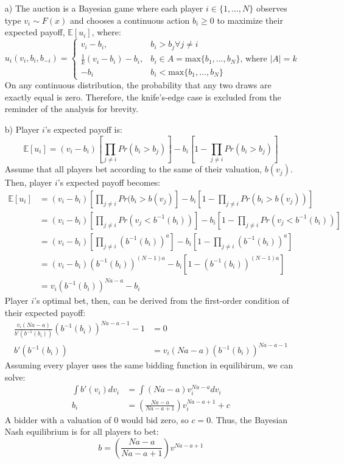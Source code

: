 \documentclass{article}
\newcommand{\E}[1]{\mathbb{E}\left[#1\right]} %
\begin{document}
\begin{itemize}
	\item[a)] The auction is a Bayesian game where each player ${i\in\{1,...,N\}}$ observes type ${v_i\sim F(x)}$ and chooses a continuous action ${b_i\geq 0}$ to maximize their expected payoff, $\E{u_i}$, where:
		\[
			u_i(v_i,b_i,b_{-i}) =	\begin{cases}
										v_i - b_i, 					&b_i>b_j \forall j\neq i									\\
										\frac{1}{k}(v_i-b_i) -b_i, 	&b_i\in A=\text{max}\{b_1,...,b_N\} \text{, where }|A|=k 	\\
										-b_i						&b_i < \text{max}\{b_1,...,b_N\}
									\end{cases}
		\]
		On any continuous distribution, the probability that any two draws are exactly equal is zero. Therefore, the knife's-edge case is excluded from the reminder of the analysis for brevity.

	
	\item[b)] Player $i$'s expected payoff is:
		{\small \[
			\E{u_i} = (v_i - b_i)\left[\prod_{j\neq i}Pr(b_i>b_j)\right] -b_i\left[1-\prod_{j\neq i}Pr(b_i>b_j)\right]
		\] }
		Assume that all players bet according to the same of their valuation, $b(v_j)$. Then, player $i$'s expected payoff becomes:
		\begin{align*}
			\E{u_i} &= (v_i - b_i)\left[\prod_{j\neq i}Pr(b_i>b(v_j)\right]-b_i\left[1-\prod_{j\neq i}Pr(b_i>b(v_j))\right] 							\\
					&= (v_i - b_i)\left[\prod_{j\neq i}Pr\left(v_j < b^{-1}(b_i)\right)\right]-b_i\left[1-\prod_{j\neq i}Pr(v_j < b^{-1}(b_i))\right]	\\
					&= (v_i - b_i)\left[\prod_{j\neq i}\left(b^{-1}(b_i)\right)^a\right]-b_i\left[1-\prod_{j\neq i}\left(b^{-1}(b_i)\right)^a\right] 	\\
					&= (v_i - b_i)\left(b^{-1}(b_i)\right)^{(N-1)a}-b_i\left[1-\left(b^{-1}(b_i)\right)^{(N-1)a}\right] 								\\
					&= v_i\left(b^{-1}(b_i)\right)^{Na-a} - b_i
		\end{align*}
		Player $i$'s optimal bet, then, can be derived from the first-order condition of their expected payoff:
		\begin{align*}
			\frac{v_i(Na-a)}{b'\left(b^{-1}(b_i)\right)}\left(b^{-1}(b_i)\right)^{Na-a-1} - 1 &= 0						\\
			b'\left(b^{-1}(b_i)\right) &= v_i(Na-a)\left(b^{-1}(b_i)\right)^{Na-a-1}								
		\end{align*}
		Assuming every player uses the same bidding function in equilibirum, we can solve:
		\begin{align*}
			\int b'(v_i)dv_i 	&= \int (Na-a)v_i^{Na-a}dv_i	\\
							b_i	&= \left(\frac{Na-a}{Na-a+1}\right)v_i^{Na-a+1} + c
		\end{align*}
		A bidder with a valuation of 0 would bid zero, so ${c=0}$. Thus, the Bayesian Nash equilibrium is for all players to bet:
			\[
				b = \left(\frac{Na-a}{Na-a+1}\right)v^{Na-a+1}
			\]
			

\end{itemize}
\end{document}
